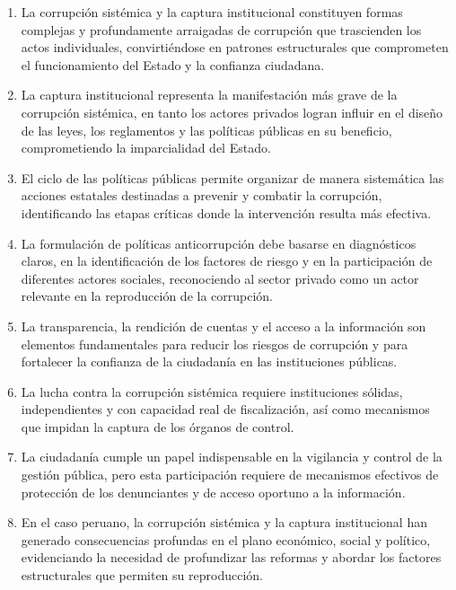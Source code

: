 \documentclass[12pt,a4paper]{article}
\begin{document}
\begin{enumerate}[label=\arabic*.]
    \item La corrupción sistémica y la captura institucional constituyen formas complejas y profundamente arraigadas de corrupción que trascienden los actos individuales, convirtiéndose en patrones estructurales que comprometen el funcionamiento del Estado y la confianza ciudadana.
    
    \item La captura institucional representa la manifestación más grave de la corrupción sistémica, en tanto los actores privados logran influir en el diseño de las leyes, los reglamentos y las políticas públicas en su beneficio, comprometiendo la imparcialidad del Estado.
    
    \item El ciclo de las políticas públicas permite organizar de manera sistemática las acciones estatales destinadas a prevenir y combatir la corrupción, identificando las etapas críticas donde la intervención resulta más efectiva.
    
    \item La formulación de políticas anticorrupción debe basarse en diagnósticos claros, en la identificación de los factores de riesgo y en la participación de diferentes actores sociales, reconociendo al sector privado como un actor relevante en la reproducción de la corrupción.
    
    \item La transparencia, la rendición de cuentas y el acceso a la información son elementos fundamentales para reducir los riesgos de corrupción y para fortalecer la confianza de la ciudadanía en las instituciones públicas.
    
    \item La lucha contra la corrupción sistémica requiere instituciones sólidas, independientes y con capacidad real de fiscalización, así como mecanismos que impidan la captura de los órganos de control.
    
    \item La ciudadanía cumple un papel indispensable en la vigilancia y control de la gestión pública, pero esta participación requiere de mecanismos efectivos de protección de los denunciantes y de acceso oportuno a la información.
    
    \item En el caso peruano, la corrupción sistémica y la captura institucional han generado consecuencias profundas en el plano económico, social y político, evidenciando la necesidad de profundizar las reformas y abordar los factores estructurales que permiten su reproducción.
\end{enumerate}
\end{document}
